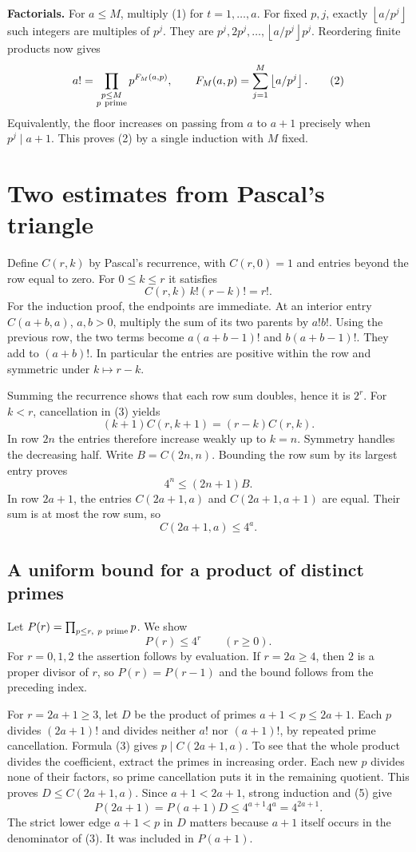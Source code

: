 \documentclass[12pt,letterpaper]{article}
\newcommand{\fl}[1]{\left\lfloor #1\right\rfloor}
\newcommand{\lead}[1]{\textsf{\bfseries\color{ink}#1}\enspace}
\newcommand{\pagepart}{\clearpage}
\begin{document}
\lead{Factorials.} For \(a\le M\), multiply (1) for \(t=1,\ldots,a\). For fixed \(p,j\), exactly \(\fl{a/p^j}\) such integers are multiples of \(p^j\). They are \(p^j,2p^j,\ldots,\fl{a/p^j}p^j\). Reordering finite products now gives
\[
 a!=\prod_{\substack{p\le M\\p\ {\rm prime}}}p^{F_M(a,p)},
 \qquad F_M(a,p)=\sum_{j=1}^{M}\fl{a/p^j}. \tag{2}\label{eq:leg}
\]
Equivalently, the floor increases on passing from \(a\) to \(a+1\) precisely when \(p^j\mid a+1\). This proves (2) by a single induction with \(M\) fixed.

\pagepart\section{Two estimates from Pascal's triangle}\label{s:binom}
Define \(C(r,k)\) by Pascal's recurrence, with \(C(r,0)=1\) and entries beyond the row equal to zero. For \(0\le k\le r\) it satisfies
\[
 C(r,k)\,k!(r-k)!=r!.
 \tag{3}\label{eq:bin}
\]
For the induction proof, the endpoints are immediate. At an interior entry \(C(a+b,a)\), \(a,b>0\), multiply the sum of its two parents by \(a!b!\). Using the previous row, the two terms become \(a(a+b-1)!\) and \(b(a+b-1)!\). They add to \((a+b)!\). In particular the entries are positive within the row and symmetric under \(k\mapsto r-k\).

Summing the recurrence shows that each row sum doubles, hence it is \(2^r\). For \(k<r\), cancellation in (3) yields
\[
 (k+1)C(r,k+1)=(r-k)C(r,k).
\]
In row \(2n\) the entries therefore increase weakly up to \(k=n\). Symmetry handles the decreasing half. Write \(B=C(2n,n)\). Bounding the row sum by its largest entry proves
\[
 4^n\le(2n+1)B. \tag{4}\label{eq:lower}
\]
In row \(2a+1\), the entries \(C(2a+1,a)\) and \(C(2a+1,a+1)\) are equal. Their sum is at most the row sum, so
\[
 C(2a+1,a)\le4^a. \tag{5}
\]

\subsection*{A uniform bound for a product of distinct primes}
Let \(P(r)=\prod_{p\le r,\ p\ {\rm prime}}p\). We show
\[
 P(r)\le4^r\qquad(r\ge0). \tag{6}\label{eq:prim}
\]
For \(r=0,1,2\) the assertion follows by evaluation. If \(r=2a\ge4\), then \(2\) is a proper divisor of \(r\), so \(P(r)=P(r-1)\) and the bound follows from the preceding index.

For \(r=2a+1\ge3\), let \(D\) be the product of primes \(a+1<p\le2a+1\). Each \(p\) divides \((2a+1)!\) and divides neither \(a!\) nor \((a+1)!\), by repeated prime cancellation. Formula (3) gives \(p\mid C(2a+1,a)\). To see that the whole product divides the coefficient, extract the primes in increasing order. Each new \(p\) divides none of their factors, so prime cancellation puts it in the remaining quotient. This proves \(D\le C(2a+1,a)\). Since \(a+1<2a+1\), strong induction and (5) give
\[
 P(2a+1)=P(a+1)D\le4^{a+1}4^a=4^{2a+1}.
\]
The strict lower edge \(a+1<p\) in \(D\) matters because \(a+1\) itself occurs in the denominator of (3). It was included in \(P(a+1)\).
\end{document}
